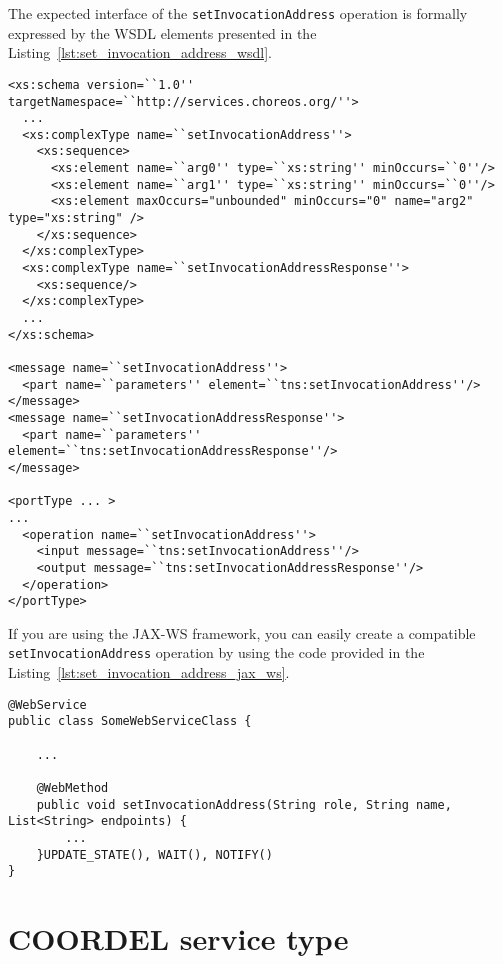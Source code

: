 The expected interface of the \texttt{setInvocationAddress} operation is formally expressed by the WSDL elements presented in the Listing~\ref{lst:set_invocation_address_wsdl}. 

{\footnotesize
\begin{lstlisting}[caption=Parts of the service WSDL that define the \texttt{setInvocationAddress} operation, label=lst:set_invocation_address_wsdl] 
<xs:schema version=``1.0'' targetNamespace=``http://services.choreos.org/''>
  ...
  <xs:complexType name=``setInvocationAddress''>
    <xs:sequence>
      <xs:element name=``arg0'' type=``xs:string'' minOccurs=``0''/>
      <xs:element name=``arg1'' type=``xs:string'' minOccurs=``0''/>
      <xs:element maxOccurs="unbounded" minOccurs="0" name="arg2" type="xs:string" />
    </xs:sequence>
  </xs:complexType>
  <xs:complexType name=``setInvocationAddressResponse''>
    <xs:sequence/>
  </xs:complexType>
  ...
</xs:schema>

<message name=``setInvocationAddress''>
  <part name=``parameters'' element=``tns:setInvocationAddress''/>
</message>
<message name=``setInvocationAddressResponse''>
  <part name=``parameters'' element=``tns:setInvocationAddressResponse''/>
</message>

<portType ... >
...
  <operation name=``setInvocationAddress''>
    <input message=``tns:setInvocationAddress''/>
    <output message=``tns:setInvocationAddressResponse''/>
  </operation>
</portType>
\end{lstlisting}
}

If you are using the JAX-WS framework, you can easily create a compatible \texttt{setInvocationAddress} operation by using the code provided in the Listing~\ref{lst:set_invocation_address_jax_ws}.

\newpage

\lstset{
language=Java
}

{\footnotesize
\begin{lstlisting}[caption=Implementing \texttt{setInvocationAddress} with JAX-WS, label=lst:set_invocation_address_jax_ws] 
@WebService
public class SomeWebServiceClass {

    ...
    
    @WebMethod
    public void setInvocationAddress(String role, String name, List<String> endpoints) {
		...
    }UPDATE_STATE(), WAIT(), NOTIFY()
}
\end{lstlisting}
}

\section{COORDEL service type}


